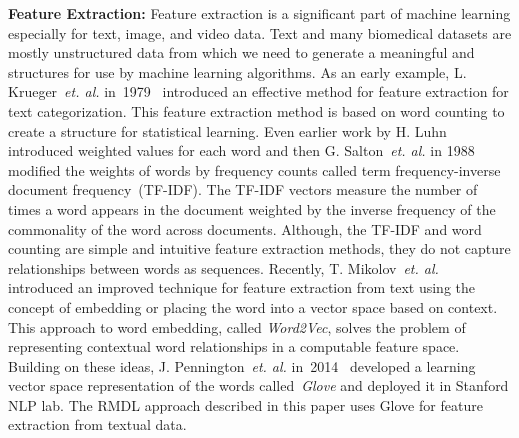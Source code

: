\documentclass[sigconf, final]{acmart}
\begin{document}
\textbf{Feature Extraction:}\label{subsec:related1}
Feature extraction is a significant part of machine learning especially for text, image, and video data. Text and many biomedical datasets are mostly unstructured data from which we need to generate a meaningful and structures for use by machine learning algorithms. As an early example, L. Krueger~\textit{et. al.} in~1979~\cite{krueger1979letter} introduced an effective method for feature extraction for text categorization. This feature extraction method is based on word counting to create a structure for statistical learning. Even earlier work by H. Luhn~\cite{luhn1957statistical} introduced weighted values for each word and then G. Salton~\textit{et. al.} in 1988~\cite{salton1988term} modified the weights of words by frequency counts called term frequency-inverse document frequency~(TF-IDF). The TF-IDF vectors measure the number of times a word appears in the document weighted by the inverse frequency of the commonality of the word across documents. Although, the TF-IDF and word counting are simple and intuitive feature extraction methods, they do not capture relationships between words as sequences. Recently, T. Mikolov~\textit{et. al.}~\cite{mikolov2013efficient} introduced an improved technique for feature extraction from text using the concept of embedding or placing the word into a vector space based on context.  This approach to word embedding, called \textit{Word2Vec}, solves the problem of representing contextual word relationships in a computable feature space. Building on these ideas, J. Pennington~\textit{et. al.} in~2014~\cite{pennington2014glove} developed a learning vector space representation of the words called~\textit{Glove} and deployed it in Stanford NLP lab. The RMDL approach described in this paper uses Glove for feature extraction from textual data.
\end{document}
